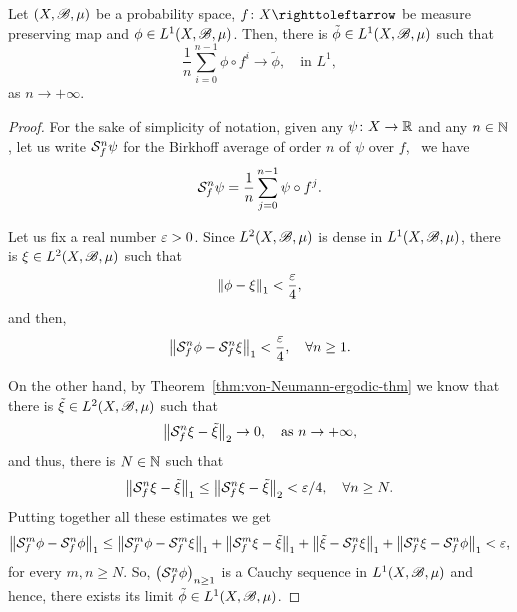 \begin{corollary}\label{cor:von-Neumann-convergence-in-L1}
  Let $(X,\mathscr{B},\mu)$ be a probability space, $f\colon X\carr$ be measure preserving map and $\phi\in L^{1}(X,\mathscr{B},\mu)$. Then, there is $\tilde\phi\in L^{1}(X,\mathscr{B},\mu)$ such that
  \begin{displaymath}
    \frac{1}{n}\sum_{i=0}^{n-1}\phi\circ f^{i}\to \tilde\phi, \quad\text{in }L^{1},
  \end{displaymath}
  as $n\to+\infty$.
\end{corollary}

\begin{proof}
  For the sake of simplicity of notation, given any $\psi\colon X\to\mathbb{R}$ and any $n\in\mathbb{N}$, let us write $\mathcal{S}_{f}^{n}\psi$ for the Birkhoff average of order $n$ of $\psi$ over $f$, \ie~we have
   \begin{displaymath}
    \mathcal{S}_{f}^{n}\psi = \frac{1}{n}\sum_{j=0}^{n-1}\psi\circ f^{j}.
  \end{displaymath}

  Let us fix a real number $\varepsilon>0$. Since $L^2(X,\mathscr{B},\mu)$ is dense in $L^1(X,\mathscr{B},\mu)$, there is $\xi\in L^2(X,\mathscr{B},\mu)$ such that
  \begin{displaymath}
    \left\|{\phi-\xi}\right\|_1<\frac{\varepsilon}{4},
  \end{displaymath}
  and then,
  \begin{displaymath}
    \left\|{\mathcal{S}_f^n\phi-\mathcal{S}_f^n\xi}\right\|_1<\frac{\varepsilon}{4}, \quad\forall n\geq 1.
  \end{displaymath}

  On the other hand, by Theorem~\ref{thm:von-Neumann-ergodic-thm} we know that there is $\tilde\xi\in L^{2}(X,\mathscr{B},\mu)$ such that
  \begin{displaymath}
    \left\|{\mathcal{S}_f^n\xi-\tilde\xi}\right\|_2\to 0, \quad\text{as } n\to+\infty,
  \end{displaymath}
  and thus, there is $N\in\mathbb{N}$ such that
  \begin{displaymath}
    \left\|{\mathcal{S}_f^n\xi-\tilde\xi}\right\|_1\leq \left\|{\mathcal{S}_f^n\xi-\tilde\xi}\right\|_2<\varepsilon/4, \quad\forall n\geq N.
  \end{displaymath}
  Putting together all these estimates we get
  \begin{displaymath}
    \left\|{\mathcal{S}_f^m\phi-\mathcal{S}_f^n\phi}\right\|_1\leq \left\|{\mathcal{S}_f^m\phi-\mathcal{S}_f^m\xi}\right\|_1 + \left\|{\mathcal{S}_f^m\xi-\tilde\xi}\right\|_1 + \left\|{\tilde\xi - \mathcal{S}_f^n\xi}\right\|_1 + \left\|{\mathcal{S}_f^n\xi-\mathcal{S}_f^n\phi}\right\|_1< \varepsilon,
  \end{displaymath}
 for every $m,n\geq N$. So, ${\big(\mathcal{S}_f^n\phi\big)}_{n\geq 1}$ is a Cauchy sequence in $L^1(X,\mathscr{B},\mu)$ and hence, there exists its limit $\tilde\phi\in L^1(X,\mathscr{B},\mu)$.
\end{proof}

